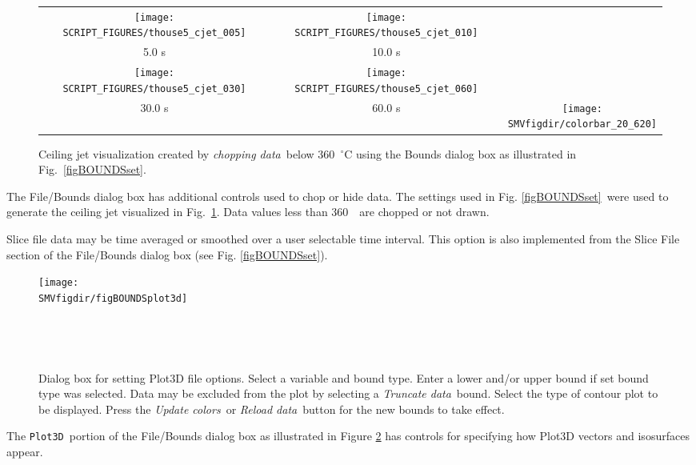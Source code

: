 \documentclass[11pt,twoside]{book}
\newcommand{\figheightAbar}{2.2in}
\begin{document}
\begin{figure}[bph]
\begin{center}
\begin{tabular}{ccc}
\texttt{[image: SCRIPT\_FIGURES/thouse5\_cjet\_005]}&
\texttt{[image: SCRIPT\_FIGURES/thouse5\_cjet\_010]}\\
5.0 s&10.0 s\\
\texttt{[image: SCRIPT\_FIGURES/thouse5\_cjet\_030]}&
\texttt{[image: SCRIPT\_FIGURES/thouse5\_cjet\_060]}&\\
30.0 s&60.0 s
&\raisebox{0.0ex}[0pt]{\texttt{[image: \\SMVfigdir/colorbar\_20\_620]}}\\
\end{tabular}
\caption [Ceiling Jet Visualization.] {   Ceiling jet
visualization created by {\em chopping data}\ below 360~$^\circ$C
using the Bounds dialog box as illustrated in
Fig.~\ref{figBOUNDSset}. }
\label{figceilingjet}%
\end{center}
\end{figure}

The File/Bounds dialog box has additional controls used to chop or
hide data. The settings used in Fig. \ref{figBOUNDSset}\ were
used to generate the ceiling jet visualized in
Fig.~\ref{figceilingjet}. Data values less than 360~\degC\ are
chopped or not drawn.

Slice file data may be time averaged or smoothed over a user
selectable time interval.  This option is also implemented from
the Slice File section of the File/Bounds dialog box (see
Fig. \ref{figBOUNDSset}).

\begin{figure}[bph]
\centerline{
\texttt{[image: \\SMVfigdir/figBOUNDSplot3d]}
}\ \caption[Dialog box for setting Plot3D file
options.] {Dialog box for setting Plot3D file
options. Select a variable and bound type. Enter a lower
and/or upper bound if set bound type was selected.  Data may be excluded from the plot by
selecting a {\em Truncate data}\ bound. Select the type of contour
plot to be displayed. Press the {\em Update colors}\ or {\em Reload data}\ button for
the new bounds to take effect.}\ \label{figBOUNDSplot3d}
\end{figure}

The {\tt Plot3D}\ portion of the File/Bounds dialog box as illustrated in Figure \ref{figBOUNDSplot3d} has controls for specifying how Plot3D vectors and isosurfaces appear.
\end{document}
